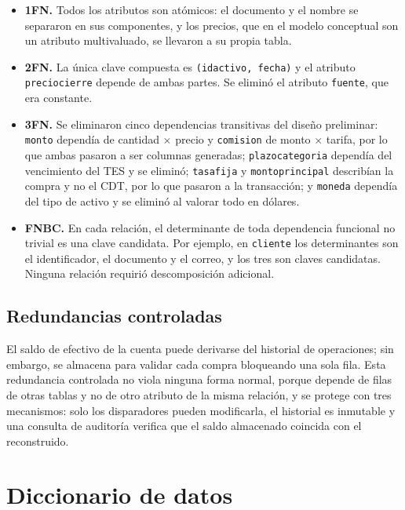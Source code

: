 \documentclass[10pt,letterpaper]{article}
\renewcommand{\_}{\oldUS\allowbreak}
\begin{document}
\begin{itemize}
  \item \textbf{1FN.} Todos los atributos son atómicos: el documento y el nombre se separaron en sus componentes, y los precios, que en el modelo conceptual son un atributo multivaluado, se llevaron a su propia tabla.
  \item \textbf{2FN.} La única clave compuesta es \texttt{(id\_activo, fecha)} y el atributo \texttt{precio\_cierre} depende de ambas partes. Se eliminó el atributo \texttt{fuente}, que era constante.
  \item \textbf{3FN.} Se eliminaron cinco dependencias transitivas del diseño preliminar: \texttt{monto} dependía de cantidad $\times$ precio y \texttt{comision} de monto $\times$ tarifa, por lo que ambas pasaron a ser columnas generadas; \texttt{plazo\_categoria} dependía del vencimiento del TES y se eliminó; \texttt{tasa\_fija} y \texttt{monto\_principal} describían la compra y no el CDT, por lo que pasaron a la transacción; y \texttt{moneda} dependía del tipo de activo y se eliminó al valorar todo en dólares.
  \item \textbf{FNBC.} En cada relación, el determinante de toda dependencia funcional no trivial es una clave candidata. Por ejemplo, en \texttt{cliente} los determinantes son el identificador, el documento y el correo, y los tres son claves candidatas. Ninguna relación requirió descomposición adicional.
\end{itemize}

\subsection{Redundancias controladas}

El saldo de efectivo de la cuenta puede derivarse del historial de operaciones; sin embargo, se almacena para validar cada compra bloqueando una sola fila. Esta redundancia controlada no viola ninguna forma normal, porque depende de filas de otras tablas y no de otro atributo de la misma relación, y se protege con tres mecanismos: solo los disparadores pueden modificarla, el historial es inmutable y una consulta de auditoría verifica que el saldo almacenado coincida con el reconstruido.

\section{Diccionario de datos}
\end{document}
